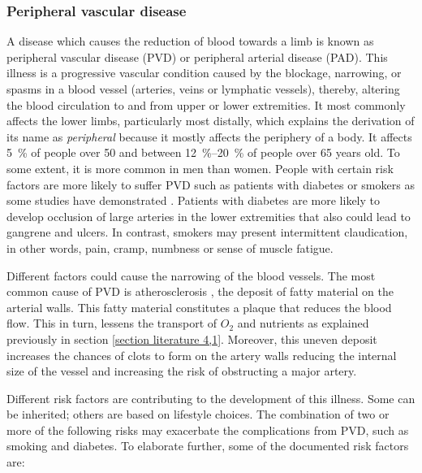 \subsubsection{Peripheral vascular disease}
\label{section literature 2.1}
A disease which causes the reduction of blood towards a limb is known as peripheral vascular disease (PVD) or peripheral arterial disease (PAD). This illness is a progressive vascular condition caused by the blockage, narrowing, or spasms in a blood vessel (arteries, veins or lymphatic vessels), thereby, altering the blood circulation to and from upper or lower extremities.  It most commonly affects the lower limbs, particularly most distally, which explains the derivation of its name as \textit{peripheral} because it mostly affects the periphery of a body. It affects \SI{5}{\percent} of people over \num{50} and between \SIrange{12}{20}{\percent} of people over 65 years old. To some extent, it is more common in men than women. People with certain risk factors are more likely to suffer PVD such as patients with diabetes or smokers as some studies have demonstrated \cite{kannel1979diabetes,janka1980peripheral, menzoian1989symptomatology, eliasson2003cigarette, stephens2004cardiovascular}. Patients with diabetes are more likely to develop occlusion of large arteries in the lower extremities that also could lead to gangrene and ulcers. In contrast, smokers may present intermittent claudication, in other words, pain, cramp, numbness or sense of muscle fatigue. 

Different factors could cause the narrowing of the blood vessels. The most common cause of PVD is atherosclerosis \cite{nichols2011mcdonald}, the deposit of fatty material on the arterial walls. This fatty material constitutes a plaque that reduces the blood flow. This in turn, lessens the transport of $O_2$ and nutrients as explained previously in section \ref{section literature 4,1}. Moreover, this uneven deposit increases the chances of clots to form on the artery walls reducing the internal size of the vessel and increasing the risk of obstructing a major artery.

Different risk factors are contributing to the development of this illness. Some can be inherited; others are based on lifestyle choices. The combination of two or more of the following risks may exacerbate the complications from PVD, such as smoking and diabetes. To elaborate further, some of the documented risk factors are: 

